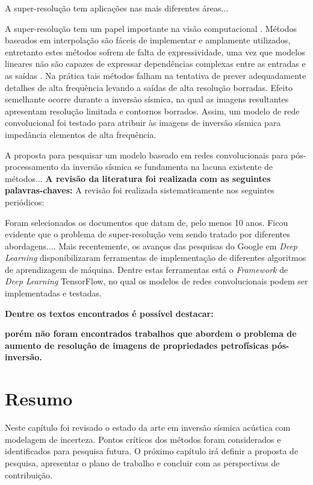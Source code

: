 A super-resolução tem aplicações nas mais diferentes áreas...

A super-resolução tem um papel importante na visão computacional \cite{DongLoy2016}.
Métodos baseados em interpolação são fáceis de implementar e amplamente utilizados,
entretanto estes métodos sofrem de falta de expressividade, uma vez que modelos lineares
não são capazes de expressar dependências complexas entre as entradas e as saídas \cite{HsiehAndrews1978}.
Na prática tais métodos falham na tentativa de prever adequadamente detalhes de alta frequência
levando a saídas de alta resolução borradas. Efeito semelhante ocorre durante a inversão sísmica,
na qual as imagens resultantes apresentam resolução limitada e contornos borrados. Assim, um modelo
de rede convolucional foi testado para atribuir às imagens de inversão sísmica para impedância
elementos de alta frequência.

A proposta para pesquisar um modelo baseado em redes convolucionais para pós-processamento
da inversão sísmica se fundamenta na lacuna existente de métodos...
\textbf{A revisão da literatura foi realizada com as seguintes palavras-chaves:}
A revisão foi realizada sistematicamente nos seguintes periódicos:

Foram selecionados os documentos que datam de, pelo menos 10 anos. Ficou evidente que o problema
de super-resolução vem sendo tratado por diferentes abordagens....
Mais recentemente, os avanços das pesquisas do Google em \textit{Deep Learning} disponibilizaram
ferramentas de implementação de diferentes algoritmos de aprendizagem de máquina. Dentre estas
ferramentas está o \textit{Framework} de \textit{Deep Learning} TensorFlow, no qual os modelos
de redes convolucionais podem ser implementadas e testadas.

\textbf{Dentre os textos encontrados é possível destacar:}

\textbf{porém não foram encontrados trabalhos que abordem o problema de aumento de resolução de imagens de propriedades petrofísicas
pós-inversão.}

\section{Resumo}

Neste capítulo foi revisado o estado da arte em inversão sísmica acústica
com modelagem de incerteza. Pontos críticos dos métodos foram considerados e
identificados para pesquisa futura. O próximo capítulo irá definir a proposta de
pesquisa, apresentar o plano de trabalho e concluir com as perspectivas de
contribuição.
